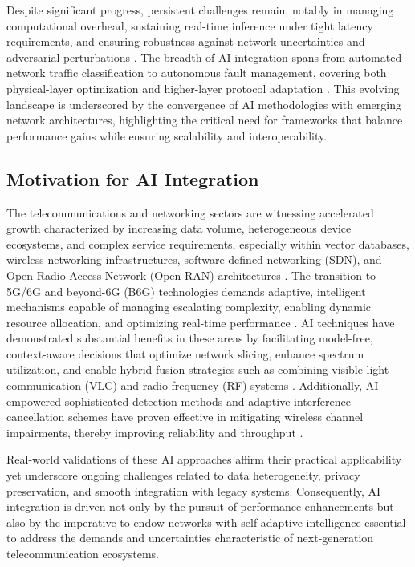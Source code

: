\documentclass[11pt]{article}
\begin{document}
Despite significant progress, persistent challenges remain, notably in managing computational overhead, sustaining real-time inference under tight latency requirements, and ensuring robustness against network uncertainties and adversarial perturbations \cite{ref7,ref8,ref9}. The breadth of AI integration spans from automated network traffic classification to autonomous fault management, covering both physical-layer optimization and higher-layer protocol adaptation \cite{ref10,ref49,ref50}. This evolving landscape is underscored by the convergence of AI methodologies with emerging network architectures, highlighting the critical need for frameworks that balance performance gains while ensuring scalability and interoperability.

\subsection{Motivation for AI Integration}

The telecommunications and networking sectors are witnessing accelerated growth characterized by increasing data volume, heterogeneous device ecosystems, and complex service requirements, especially within vector databases, wireless networking infrastructures, software-defined networking (SDN), and Open Radio Access Network (Open RAN) architectures \cite{ref21,ref22,ref23}. The transition to 5G/6G and beyond-6G (B6G) technologies demands adaptive, intelligent mechanisms capable of managing escalating complexity, enabling dynamic resource allocation, and optimizing real-time performance \cite{ref24,ref25}. AI techniques have demonstrated substantial benefits in these areas by facilitating model-free, context-aware decisions that optimize network slicing, enhance spectrum utilization, and enable hybrid fusion strategies such as combining visible light communication (VLC) and radio frequency (RF) systems \cite{ref51,ref52}. Additionally, AI-empowered sophisticated detection methods and adaptive interference cancellation schemes have proven effective in mitigating wireless channel impairments, thereby improving reliability and throughput \cite{ref54,ref55}. 

Real-world validations of these AI approaches affirm their practical applicability yet underscore ongoing challenges related to data heterogeneity, privacy preservation, and smooth integration with legacy systems. Consequently, AI integration is driven not only by the pursuit of performance enhancements but also by the imperative to endow networks with self-adaptive intelligence essential to address the demands and uncertainties characteristic of next-generation telecommunication ecosystems.
\end{document}
